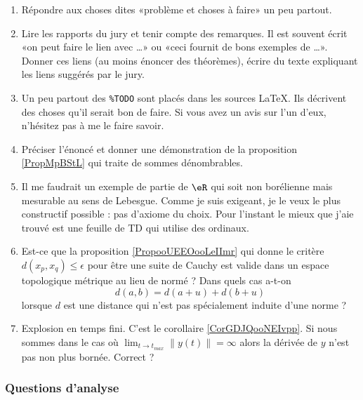 \begin{enumerate}
    \item
        Répondre aux choses dites «problème et choses à faire»  un peu partout.
    \item
        Lire les rapports du jury et tenir compte des remarques. Il est souvent écrit «on peut faire le lien avec \ldots» ou «ceci fournit de bons exemples de \ldots». Donner ces liens (au moins énoncer des théorèmes), écrire du texte expliquant les liens suggérés par le jury.
    \item
        Un peu partout des \verb+%TODO+ sont placés dans les sources \LaTeX. Ils décrivent des choses qu'il serait bon de faire. Si vous avez un avis sur l'un d'eux, n'hésitez pas à me le faire savoir.
    \item
        Préciser l'énoncé et donner une démonstration de la proposition \ref{PropMpBStL} qui traite de sommes dénombrables.
    \item
        Il me faudrait un exemple de partie de \( \eR\) qui soit non borélienne mais mesurable au sens de Lebesgue. Comme je suis exigeant, je le veux le plus constructif possible : pas d'axiome du choix. Pour l'instant le mieux que j'aie trouvé est une feuille de TD\cite{XSHoosgoQa} qui utilise des ordinaux.
    \item
        Est-ce que la proposition \ref{PropooUEEOooLeIImr} qui donne le critère \( d(x_p,x_q)\leq \epsilon\) pour être une suite de Cauchy est valide dans un espace topologique métrique au lieu de normé ?  Dans quels cas a-t-on
        \begin{equation}
            d(a,b)=d(a+u)+d(b+u) 
        \end{equation}
        lorsque \( d\) est une distance qui n'est pas spécialement induite d'une norme ?
    \item
        Explosion en temps fini. C'est le corollaire \ref{CorGDJQooNEIvpp}. Si nous sommes dans le cas où \( \lim_{t\to t_{max}} \| y(t) \|=\infty\) alors la dérivée de \( y\) n'est pas non plus bornée. Correct ?
\end{enumerate}

\subsubsection{Questions d'analyse}

